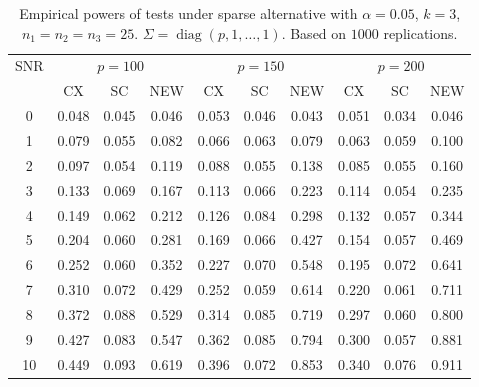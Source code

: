 \documentclass{beamer}
\DeclareMathOperator{\mydiag}{diag}
\theoremstyle{plain}
\theoremstyle{definition}
\theoremstyle{remark}
\begin{document}
\begin{frame}
\begin{table}[!hbp]\scriptsize
    \caption{Empirical powers of tests under sparse alternative with $\alpha=0.05$, $k=3$, $n_1=n_2=n_3=25$. $\Sigma=\mydiag(p,1,\ldots,1)$. Based on $1000$ replications.}
    \centering
\begin{tabular}{*{10}{c}}
\toprule
\multirow{2}{*}{SNR} &\multicolumn{3}{c}{$p=100$}&\multicolumn{3}{c}{$p=150$}&\multicolumn{3}{c}{$p=200$} \\
    \cmidrule(r){2-4}\cmidrule(r){5-7}\cmidrule(r){8-10}
        & CX & SC & NEW & CX &SC &NEW &CX & SC & NEW\\
\midrule
0 & 0.048 & 0.045 & 0.046 & 0.053 & 0.046 & 0.043 & 0.051 & 0.034 & 0.046 \\ 
1 & 0.079 & 0.055 & 0.082 & 0.066 & 0.063 & 0.079 & 0.063 & 0.059 & 0.100 \\ 
2 & 0.097 & 0.054 & 0.119 & 0.088 & 0.055 & 0.138 & 0.085 & 0.055 & 0.160 \\ 
3 & 0.133 & 0.069 & 0.167 & 0.113 & 0.066 & 0.223 & 0.114 & 0.054 & 0.235 \\ 
4 & 0.149 & 0.062 & 0.212 & 0.126 & 0.084 & 0.298 & 0.132 & 0.057 & 0.344 \\ 
5 & 0.204 & 0.060 & 0.281 & 0.169 & 0.066 & 0.427 & 0.154 & 0.057 & 0.469 \\ 
6 & 0.252 & 0.060 & 0.352 & 0.227 & 0.070 & 0.548 & 0.195 & 0.072 & 0.641 \\ 
7 & 0.310 & 0.072 & 0.429 & 0.252 & 0.059 & 0.614 & 0.220 & 0.061 & 0.711 \\ 
8 & 0.372 & 0.088 & 0.529 & 0.314 & 0.085 & 0.719 & 0.297 & 0.060 & 0.800 \\ 
9 & 0.427 & 0.083 & 0.547 & 0.362 & 0.085 & 0.794 & 0.300 & 0.057 & 0.881 \\ 
10 & 0.449 & 0.093 & 0.619 & 0.396 & 0.072 & 0.853 & 0.340 & 0.076 & 0.911 \\ 
\bottomrule
\end{tabular}
\end{table}

\end{frame}
\end{document}
